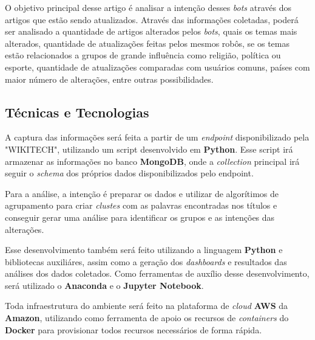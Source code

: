 \documentclass[a4paper, 12pt]{article}
\begin{document}
O objetivo principal desse artigo é analisar a intenção desses \textit{bots} através dos artigos que estão sendo atualizados.
Através das informações coletadas, poderá ser analisado a quantidade de artigos alterados pelos \textit{bots}, quais os temas mais alterados, quantidade de atualizações feitas pelos mesmos robôs, se os temas estão relacionados a grupos de grande influência como religião, política ou esporte, quantidade de atualizações comparadas com usuários comuns, países com maior número de alterações, entre outras possibilidades.

\subsection{Técnicas e Tecnologias}

A captura das informações será feita a partir de um \textit{endpoint} disponibilizado pela "WIKITECH"\cite{Wikitech}, utilizando um script desenvolvido em \textbf{Python}. Esse script irá armazenar as informações no banco \textbf{MongoDB}, onde a \textit{collection} principal irá seguir o \textit{schema} dos próprios dados disponibilizados pelo endpoint\cite{schema}.

Para a análise, a intenção é preparar os dados e utilizar de algorítimos de agrupamento\cite{book1} para criar \textit{clustes} com as palavras encontradas nos títulos e conseguir gerar uma análise para identificar os grupos e as intenções das alterações. 

Esse desenvolvimento também será feito utilizando a linguagem \textbf{Python} e bibliotecas auxiliáres, assim como a geração dos \textit{dashboards} e resultados das análises dos dados coletados. Como ferramentas de auxílio desse desenvolvimento, será utilizado o \textbf{Anaconda} e o \textbf{Jupyter Notebook}.

Toda infraestrutura do ambiente será feito na plataforma de \textit{cloud} \textbf{AWS} da \textbf{Amazon}, utilizando como ferramenta de apoio os recursos de \textit{containers} do \textbf{Docker} para provisionar todos recursos necessários de forma rápida.

\newpage



\end{document}
